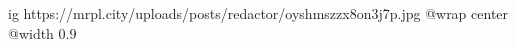  
 
 
 
 

\ifcmt
  ig https://mrpl.city/uploads/posts/redactor/oyshmszzx8on3j7p.jpg
  @wrap center
  @width 0.9
\fi
